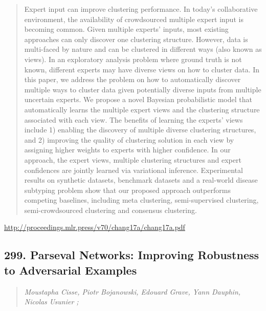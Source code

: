 \documentclass{article}
\begin{document}
\begin{quote}
    Expert input can improve clustering performance. In today’s collaborative environment, the availability of crowdsourced multiple expert input is becoming common. Given multiple experts’ inputs, most existing approaches can only discover one clustering structure. However, data is multi-faced by nature and can be clustered in different ways (also known as views). In an exploratory analysis problem where ground truth is not known, different experts may have diverse views on how to cluster data. In this paper, we address the problem on how to automatically discover multiple ways to cluster data given potentially diverse inputs from multiple uncertain experts. We propose a novel Bayesian probabilistic model that automatically learns the multiple expert views and the clustering structure associated with each view. The benefits of learning the experts’ views include 1) enabling the discovery of multiple diverse clustering structures, and 2) improving the quality of clustering solution in each view by assigning higher weights to experts with higher confidence. In our approach, the expert views, multiple clustering structures and expert confidences are jointly learned via variational inference. Experimental results on synthetic datasets, benchmark datasets and a real-world disease subtyping problem show that our proposed approach outperforms competing baselines, including meta clustering, semi-supervised clustering, semi-crowdsourced clustering and consensus clustering.  \end{quote}

\href{http://proceedings.mlr.press/v70/chang17a/chang17a.pdf}{http://proceedings.mlr.press/v70/chang17a/chang17a.pdf}

\subsection{299. Parseval Networks: Improving Robustness to Adversarial Examples}

\begin{quote}
\footnotesize{\textit{Moustapha Cisse, Piotr Bojanowski, Edouard Grave, Yann Dauphin, Nicolas Usunier ;}}
\end{quote}
\end{document}
